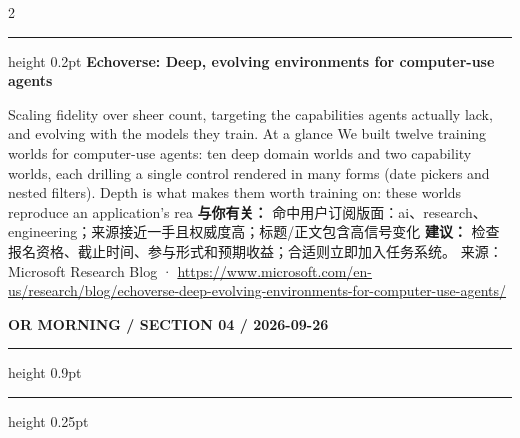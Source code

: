 \documentclass[10.5pt]{ctexart}
\begin{document}
\begin{multicols}{2}
\vspace{2mm}
\hrule height 0.2pt
\vspace{2mm}
{\large\bfseries Echoverse: Deep, evolving environments for computer-use agents}\par
Scaling fidelity over sheer count, targeting the capabilities agents actually lack, and evolving with the models they train. At a glance We built twelve training worlds for computer-use agents: ten deep domain worlds and two capability worlds, each drilling a single control rendered in many forms (date pickers and nested filters). Depth is what makes them worth training on: these worlds reproduce an application’s rea
\textbf{与你有关：} 命中用户订阅版面：ai、research、engineering；来源接近一手且权威度高；标题/正文包含高信号变化
\textbf{建议：} 检查报名资格、截止时间、参与形式和预期收益；合适则立即加入任务系统。
{\footnotesize\color{ormuted} 来源：Microsoft Research Blog · \url{https://www.microsoft.com/en-us/research/blog/echoverse-deep-evolving-environments-for-computer-use-agents/}}
\end{multicols}
\newpage
{\small\bfseries OR MORNING / SECTION 04 / 2026-09-26}
\vspace{2mm}
\hrule height 0.9pt
\vspace{1.5mm}
\hrule height 0.25pt
\vspace{4mm}
\end{document}
